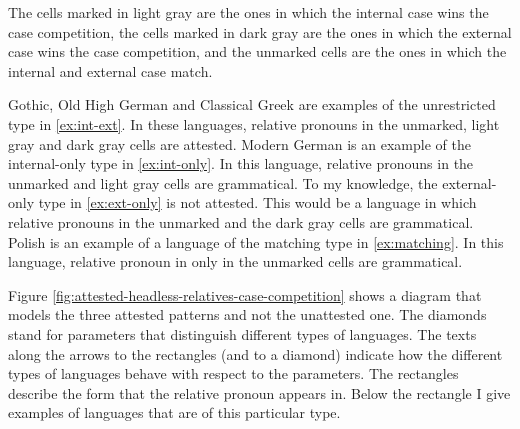 The cells marked in light gray are the ones in which the internal case wins the case competition, the cells marked in dark gray are the ones in which the external case wins the case competition, and the unmarked cells are the ones in which the internal and external case match.

Gothic, Old High German and Classical Greek are examples of the unrestricted type in \ref{ex:int-ext}. In these languages, relative pronouns in the unmarked, light gray and dark gray cells are attested.
Modern German is an example of the internal-only type in \ref{ex:int-only}. In this language, relative pronouns in the unmarked and light gray cells are grammatical.
To my knowledge, the external-only type in \ref{ex:ext-only} is not attested. This would be a language in which relative pronouns in the unmarked and the dark gray cells are grammatical.
Polish is an example of a language of the matching type in \ref{ex:matching}. In this language, relative pronoun in only in the unmarked cells are grammatical.

Figure \ref{fig:attested-headless-relatives-case-competition} shows a diagram that models the three attested patterns and not the unattested one. The diamonds stand for parameters that distinguish different types of languages. The texts along the arrows to the rectangles (and to a diamond) indicate how the different types of languages behave with respect to the parameters. The rectangles describe the form that the relative pronoun appears in. Below the rectangle I give examples of languages that are of this particular type.

